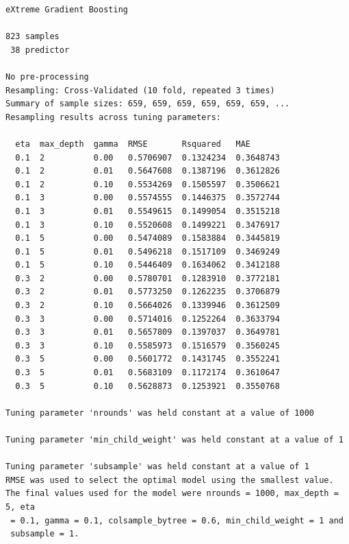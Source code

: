 \documentclass[
  letterpaper,
  DIV=11,
  numbers=noendperiod]{scrreprt}
\newenvironment{Shaded}{\begin{snugshade}}{\end{snugshade}}
\newcommand{\NormalTok}[1]{\textcolor[rgb]{0.00,0.23,0.31}{#1}}
\newcommand{\SpecialCharTok}[1]{\textcolor[rgb]{0.37,0.37,0.37}{#1}}
\begin{document}
\begin{verbatim}
eXtreme Gradient Boosting 

823 samples
 38 predictor

No pre-processing
Resampling: Cross-Validated (10 fold, repeated 3 times) 
Summary of sample sizes: 659, 659, 659, 659, 659, 659, ... 
Resampling results across tuning parameters:

  eta  max_depth  gamma  RMSE       Rsquared   MAE      
  0.1  2          0.00   0.5706907  0.1324234  0.3648743
  0.1  2          0.01   0.5647608  0.1387196  0.3612826
  0.1  2          0.10   0.5534269  0.1505597  0.3506621
  0.1  3          0.00   0.5574555  0.1446375  0.3572744
  0.1  3          0.01   0.5549615  0.1499054  0.3515218
  0.1  3          0.10   0.5520608  0.1499221  0.3476917
  0.1  5          0.00   0.5474089  0.1583884  0.3445819
  0.1  5          0.01   0.5496218  0.1517109  0.3469249
  0.1  5          0.10   0.5446409  0.1634062  0.3412188
  0.3  2          0.00   0.5780701  0.1283910  0.3772181
  0.3  2          0.01   0.5773250  0.1262235  0.3706879
  0.3  2          0.10   0.5664026  0.1339946  0.3612509
  0.3  3          0.00   0.5714016  0.1252264  0.3633794
  0.3  3          0.01   0.5657809  0.1397037  0.3649781
  0.3  3          0.10   0.5585973  0.1516579  0.3560245
  0.3  5          0.00   0.5601772  0.1431745  0.3552241
  0.3  5          0.01   0.5683109  0.1172174  0.3610647
  0.3  5          0.10   0.5628873  0.1253921  0.3550768

Tuning parameter 'nrounds' was held constant at a value of 1000

Tuning parameter 'min_child_weight' was held constant at a value of 1

Tuning parameter 'subsample' was held constant at a value of 1
RMSE was used to select the optimal model using the smallest value.
The final values used for the model were nrounds = 1000, max_depth = 5, eta
 = 0.1, gamma = 0.1, colsample_bytree = 0.6, min_child_weight = 1 and
 subsample = 1.
\end{verbatim}

\begin{Shaded}
\end{Shaded}
\end{document}
